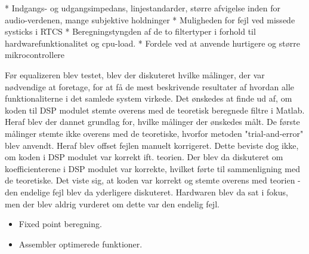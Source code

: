 * Indgangs- og udgangsimpedans, linjestandarder, større afvigelse inden for audio-verdenen, mange subjektive holdninger
* Muligheden for fejl ved missede systicks i RTCS
* Beregningstyngden af de to filtertyper i forhold til hardwarefunktionalitet og cpu-load. 
* Fordele ved at anvende hurtigere og større mikrocontrollere



Før equalizeren blev testet, blev der diskuteret hvilke målinger, der var nødvendige at foretage, for at få de mest beskrivende resultater af hvordan alle funktionaliterne i det samlede system virkede.
Det ønskedes at finde ud af, om koden til DSP modulet stemte overens med de teoretisk beregnede filtre i Matlab. 
Heraf blev der dannet grundlag for, hvilke målinger der ønskedes målt.
De første målinger stemte ikke overens med de teoretiske, hvorfor metoden "trial-and-error" blev anvendt. 
Heraf blev offset fejlen manuelt korrigeret.
Dette beviste dog ikke, om koden i DSP modulet var korrekt ift. teorien.
Der blev da diskuteret om koefficienterene i DSP modulet var korrekte, hvilket førte til sammenligning med de teoretiske.
Det viste sig, at koden var korrekt og stemte overens med teorien - den endelige fejl blev da yderligere diskuteret.
Hardwaren blev da sat i fokus, men der blev aldrig vurderet om dette var den endelig fejl.





 


\begin{itemize}
\item Fixed point beregning.
\item Assembler optimerede funktioner.
\end{itemize}